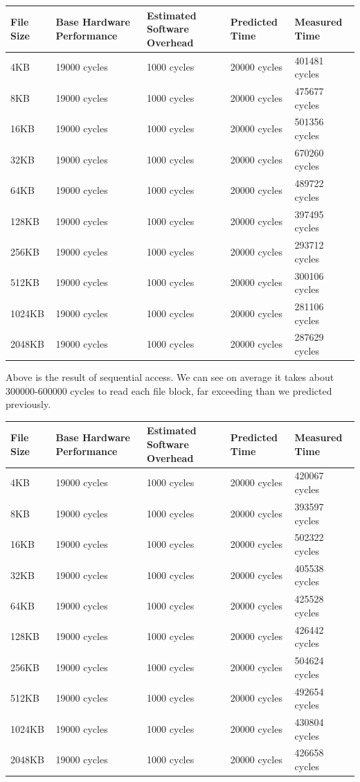 \begin{center}
\begin{tabular}{| p{4cm} | p{2.5cm} | p{2.5cm} | p{2.5cm} | p{2.5cm} |}
File Size &  Base Hardware Performance  & Estimated Software Overhead  & Predicted Time  & Measured Time   \\

\hline
4KB & 19000 cycles& 1000 cycles& 20000 cycles& 401481 cycles\\ 
8KB & 19000 cycles& 1000 cycles& 20000 cycles& 475677 cycles\\ 
16KB & 19000 cycles& 1000 cycles& 20000 cycles& 501356 cycles\\
32KB & 19000 cycles& 1000 cycles& 20000 cycles& 670260 cycles\\
64KB & 19000 cycles& 1000 cycles& 20000 cycles& 489722 cycles\\
128KB & 19000 cycles& 1000 cycles& 20000 cycles& 397495 cycles\\
256KB & 19000 cycles& 1000 cycles& 20000 cycles& 293712 cycles\\
512KB & 19000 cycles& 1000 cycles& 20000 cycles& 300106 cycles\\
1024KB & 19000 cycles& 1000 cycles& 20000 cycles& 281106 cycles\\
2048KB & 19000 cycles& 1000 cycles& 20000 cycles& 287629 cycles\\

\end{tabular}
\end{center}

Above is the result of sequential access. We can see on average it takes about 300000-600000 cycles to read each file block, far exceeding than we predicted previously.

\begin{center}
\begin{tabular}{| p{4cm} | p{2.5cm} | p{2.5cm} | p{2.5cm} | p{2.5cm} |}
File Size   & Base Hardware Performance  & Estimated Software Overhead  & Predicted Time  & Measured Time   \\
\hline
4KB & 19000 cycles& 1000 cycles& 20000 cycles& 420067 cycles\\ 
8KB & 19000 cycles& 1000 cycles& 20000 cycles& 393597 cycles\\ 
16KB & 19000 cycles& 1000 cycles& 20000 cycles& 502322 cycles\\
32KB & 19000 cycles& 1000 cycles& 20000 cycles& 405538 cycles\\
64KB & 19000 cycles& 1000 cycles& 20000 cycles& 425528 cycles\\
128KB & 19000 cycles& 1000 cycles& 20000 cycles& 426442 cycles\\
256KB & 19000 cycles& 1000 cycles& 20000 cycles& 504624 cycles\\
512KB & 19000 cycles& 1000 cycles& 20000 cycles& 492654 cycles\\
1024KB & 19000 cycles& 1000 cycles& 20000 cycles& 430804 cycles\\
2048KB & 19000 cycles& 1000 cycles& 20000 cycles& 426658 cycles\\

\end{tabular}
\end{center}


